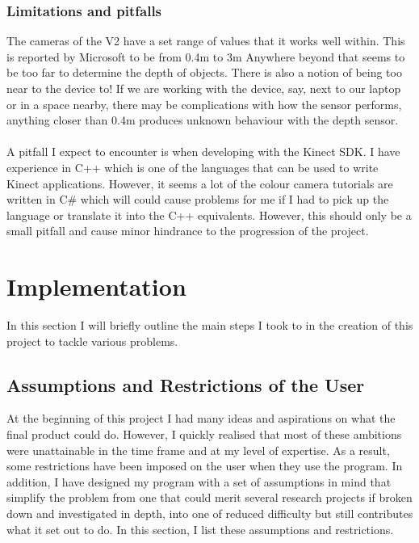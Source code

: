 \documentclass[11pt]{article}
\begin{document}
\subsubsection{Limitations and pitfalls}
The cameras of the V2 have a set range of values that it works well within.
This is reported by Microsoft to be from 0.4m to 3m
Anywhere beyond that seems to be too
far to determine the depth of objects. There is also a notion of being too near
to the device to! If we are working with the device, say, next to our laptop or
in a space nearby, there may be complications with how the sensor performs, 
anything closer than 0.4m produces unknown behaviour with the depth sensor.\\ 
\\
A pitfall I expect to encounter is when developing with the Kinect SDK. I have
experience in C++ which is one of the languages that can be used to write Kinect 
applications. However, it seems a lot of the colour camera tutorials are written
in C\# which will could cause problems for me if I had to pick up the language 
or translate it into the C++ equivalents. However, this should only be a small
pitfall and cause minor hindrance to the progression of the project.

\newpage

\section{Implementation}
\label{chapter:implementation}
In this section I will briefly outline the main steps I took to in
the creation of this project to tackle various problems.
\subsection{Assumptions and Restrictions of the User}
\label{sec:assumptions}
At the beginning of this project I had many ideas and aspirations on
what the final product could do. However, I quickly realised that most
of these ambitions were unattainable in the time frame and at my level
of expertise. As a result, some restrictions have been imposed on the
user when they use the program. In addition, I have designed my
program with a set of assumptions in mind that simplify the problem from
one that could merit several research projects if broken down and 
investigated in depth, into one of reduced difficulty but still 
contributes what it set out to do. In this section, I list these
assumptions and restrictions. 
\end{document}

